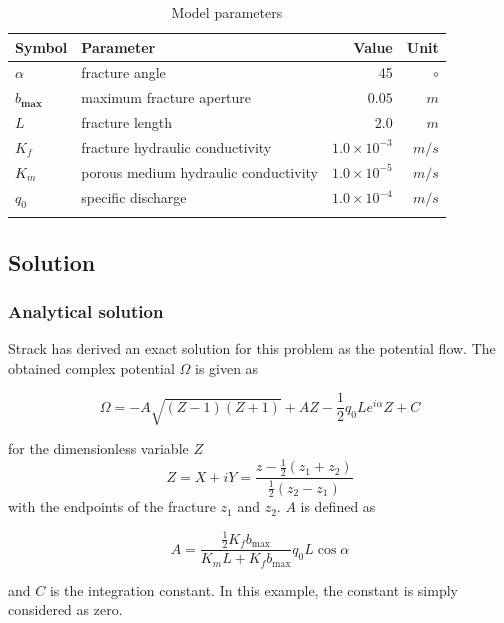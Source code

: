 \begin{table}[htb]
\centering
\caption{Model parameters}
\begin{tabular*}{0.9\textwidth}{@{\extracolsep{\fill}}llrr}
\hline\noalign{\smallskip}
 Symbol &Parameter& Value & Unit \\ 
\hline\noalign{\smallskip}
$\alpha$ 				&fracture angle  		& 45 									&  $\circ$  \\		
$b_\mathbf{max}$ 	&maximum fracture aperture & $0.05$  & $m$ \\
$L$ 	& fracture length & $2.0$  & $m$ \\
$K_f$ 	&fracture hydraulic conductivity & $1.0\times 10^{-3}$ 	& $m/s$ \\
$K_m$ 	&porous medium hydraulic conductivity & $1.0\times 10^{-5}$ 	& $m/s$ \\
$q_0$ 	&specific discharge & $1.0\times 10^{-4}$ 	& $m/s$ \\
\noalign{\smallskip}\hline
\end{tabular*}
\label{tab:Hmf_parameters}
\end{table}

\subsection{Solution}
\subsubsection{Analytical solution}
Strack \cite{Strack1982} has derived an exact solution for this problem as the potential flow. The obtained complex potential $\Omega$ is given as

\begin{equation}
\Omega = - A \sqrt{(Z-1)(Z+1)} + A Z - \frac{1}{2} q_0 L e^{i \alpha} Z + C	
\end{equation}

\noindent
for the dimensionless variable $Z$ 
%
\begin{equation}
Z = X + i Y = \frac{z-\frac{1}{2}(z_1+z_2)}{\frac{1}{2}(z_2-z_1)}	
\end{equation}
%
with the endpoints of the fracture $z_1$ and $z_2$. $A$ is defined as

\begin{equation}
A = \frac{\frac{1}{2}K_f b_\mathrm{max}}{K_m L + K_f b_\mathrm{max}}	q_0 L \cos \alpha
\end{equation}

\noindent
and $C$ is the integration constant. In this example, the constant is simply considered as zero.


